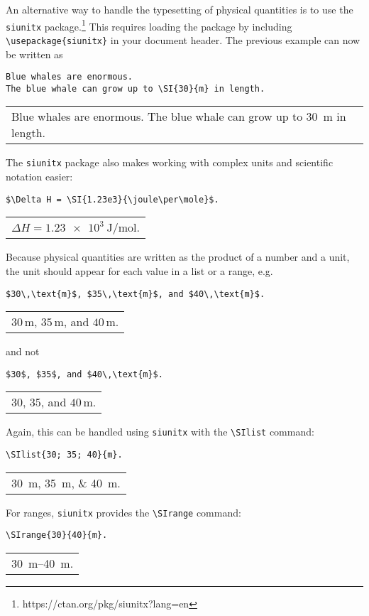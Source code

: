 \documentclass[a4paper]{tufte-handout}
\begin{document}
An alternative way to handle the typesetting of physical quantities is to use the \lstinline{siunitx} package.\footnote{https://ctan.org/pkg/siunitx?lang=en} This requires loading the package by including \lstinline$\usepackage{siunitx}$ in your document header. The previous example can now be written as
\begin{lstlisting}
Blue whales are enormous. 
The blue whale can grow up to \SI{30}{m} in length.
\end{lstlisting}
\begin{tabular}{|p{10cm}}
Blue whales are enormous. The blue whale can grow up to \SI{30}{m} in length.
\end{tabular}

The \lstinline{siunitx} package also makes working with complex units and scientific notation easier:
\begin{lstlisting}
$\Delta H = \SI{1.23e3}{\joule\per\mole}$.
\end{lstlisting}
\begin{tabular}{|p{10cm}}
$\Delta H = \SI{1.23e3}{\joule\per\mole}$.
\end{tabular}

Because physical quantities are written as the product of a number and a unit, the unit should appear for each value in a list or a range, e.g.
\begin{lstlisting}
$30\,\text{m}$, $35\,\text{m}$, and $40\,\text{m}$.
\end{lstlisting}
\begin{tabular}{|p{10cm}}
$30\,\text{m}$, $35\,\text{m}$, and $40\,\text{m}$.
\end{tabular}

and not 
\begin{lstlisting}
$30$, $35$, and $40\,\text{m}$.
\end{lstlisting}
\begin{tabular}{|p{10cm}}
$30$, $35$, and $40\,\text{m}$.
\end{tabular}

Again, this can be handled using \lstinline{siunitx} with the \lstinline{\SIlist} command:
\begin{lstlisting}
\SIlist{30; 35; 40}{m}.
\end{lstlisting}
\begin{tabular}{|p{10cm}}
\SIlist{30; 35; 40}{m}.
\end{tabular}

For ranges, \lstinline{siunitx} provides the \lstinline{\SIrange} command:
\begin{lstlisting}
\SIrange{30}{40}{m}.
\end{lstlisting}
\begin{tabular}{|p{10cm}}
\SIrange{30}{40}{m}.
\end{tabular}
\end{document}
